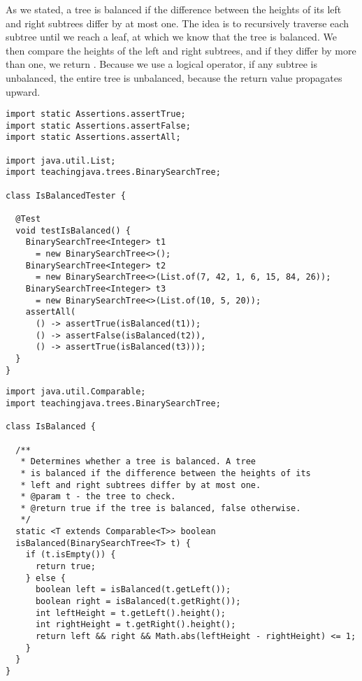  As we stated, a tree is balanced if the difference between the heights of its left and right subtrees differ by at most one. The idea is to recursively traverse each subtree until we reach a leaf, at which we know that the tree is balanced. We then compare the heights of the left and right subtrees, and if they differ by more than one, we return . Because we use a logical  operator, if any subtree is unbalanced, the entire tree is unbalanced, because the  return value propagates upward.

\begin{lstlisting}[language=MyJava]
import static Assertions.assertTrue;
import static Assertions.assertFalse;
import static Assertions.assertAll;

import java.util.List;
import teachingjava.trees.BinarySearchTree;

class IsBalancedTester {

  @Test
  void testIsBalanced() {
    BinarySearchTree<Integer> t1 
      = new BinarySearchTree<>();
    BinarySearchTree<Integer> t2 
      = new BinarySearchTree<>(List.of(7, 42, 1, 6, 15, 84, 26));
    BinarySearchTree<Integer> t3 
      = new BinarySearchTree<>(List.of(10, 5, 20));
    assertAll(
      () -> assertTrue(isBalanced(t1));
      () -> assertFalse(isBalanced(t2)),
      () -> assertTrue(isBalanced(t3)));
  }
}
\end{lstlisting}

\begin{lstlisting}[language=MyJava]
import java.util.Comparable;
import teachingjava.trees.BinarySearchTree;

class IsBalanced {

  /**
   * Determines whether a tree is balanced. A tree 
   * is balanced if the difference between the heights of its 
   * left and right subtrees differ by at most one.
   * @param t - the tree to check.
   * @return true if the tree is balanced, false otherwise.
   */
  static <T extends Comparable<T>> boolean 
  isBalanced(BinarySearchTree<T> t) {
    if (t.isEmpty()) {
      return true;
    } else {
      boolean left = isBalanced(t.getLeft());
      boolean right = isBalanced(t.getRight());
      int leftHeight = t.getLeft().height();
      int rightHeight = t.getRight().height();
      return left && right && Math.abs(leftHeight - rightHeight) <= 1;
    }
  }
}
\end{lstlisting}

